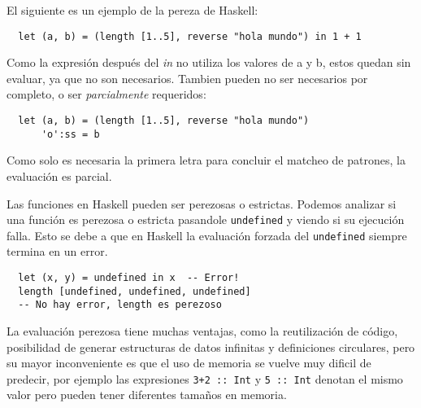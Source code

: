 El siguiente es un ejemplo de la pereza de Haskell:

\begin{lstlisting}
  let (a, b) = (length [1..5], reverse "hola mundo") in 1 + 1
\end{lstlisting}

Como la expresión después del \textit{in} no utiliza los valores de a y b,
estos quedan sin evaluar, ya que no son necesarios. Tambien pueden no ser
necesarios por completo, o ser \textit{parcialmente} requeridos:

\begin{lstlisting}
  let (a, b) = (length [1..5], reverse "hola mundo")
      'o':ss = b
\end{lstlisting}

Como solo es necesaria la primera letra para concluir el matcheo de
patrones, la evaluación es parcial.

Las funciones en Haskell pueden ser perezosas o estrictas. Podemos analizar
si una función es perezosa o estricta pasandole \lstinline$undefined$ y viendo
si su ejecución falla. Esto se debe a que en Haskell la evaluación forzada del
\lstinline$undefined$ siempre termina en un error.

\begin{lstlisting}
  let (x, y) = undefined in x  -- Error!
  length [undefined, undefined, undefined]
  -- No hay error, length es perezoso
\end{lstlisting}


La evaluación perezosa tiene muchas ventajas, como la reutilización de código,
posibilidad de generar estructuras de datos infinitas y definiciones
circulares, pero su mayor inconveniente es que el uso de memoria se vuelve muy
dificil de predecir, por ejemplo las expresiones \lstinline$3+2 :: Int$ y
\lstinline$5 :: Int$ denotan el mismo valor pero pueden tener diferentes
tamaños en memoria.

